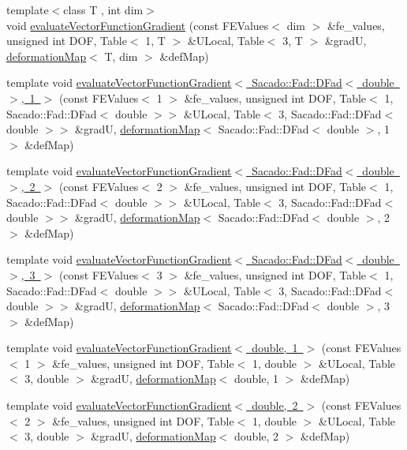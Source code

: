 \begin{DoxyCompactItemize}
\item 
{\footnotesize template$<$class T , int dim$>$ }\\void \mbox{\hyperlink{group___evaluation_functions_ga5adf8aa2d91dbdf393aa91dcc65e42e8}{evaluate\+Vector\+Function\+Gradient}} (const F\+E\+Values$<$ dim $>$ \&fe\+\_\+values, unsigned int D\+OF, Table$<$ 1, T $>$ \&U\+Local, Table$<$ 3, T $>$ \&gradU, \mbox{\hyperlink{structdeformation_map}{deformation\+Map}}$<$ T, dim $>$ \&def\+Map)
\item 
template void \mbox{\hyperlink{function_evaluations_8cc_a1fb7d1f43d659f0916ca96a9c951931c}{evaluate\+Vector\+Function\+Gradient$<$ Sacado\+::\+Fad\+::\+D\+Fad$<$ double $>$, 1 $>$}} (const F\+E\+Values$<$ 1 $>$ \&fe\+\_\+values, unsigned int D\+OF, Table$<$ 1, Sacado\+::\+Fad\+::\+D\+Fad$<$ double $>$$>$ \&U\+Local, Table$<$ 3, Sacado\+::\+Fad\+::\+D\+Fad$<$ double $>$$>$ \&gradU, \mbox{\hyperlink{structdeformation_map}{deformation\+Map}}$<$ Sacado\+::\+Fad\+::\+D\+Fad$<$ double $>$, 1 $>$ \&def\+Map)
\item 
template void \mbox{\hyperlink{function_evaluations_8cc_a85f7c6e4046993a83815972185df45ab}{evaluate\+Vector\+Function\+Gradient$<$ Sacado\+::\+Fad\+::\+D\+Fad$<$ double $>$, 2 $>$}} (const F\+E\+Values$<$ 2 $>$ \&fe\+\_\+values, unsigned int D\+OF, Table$<$ 1, Sacado\+::\+Fad\+::\+D\+Fad$<$ double $>$$>$ \&U\+Local, Table$<$ 3, Sacado\+::\+Fad\+::\+D\+Fad$<$ double $>$$>$ \&gradU, \mbox{\hyperlink{structdeformation_map}{deformation\+Map}}$<$ Sacado\+::\+Fad\+::\+D\+Fad$<$ double $>$, 2 $>$ \&def\+Map)
\item 
template void \mbox{\hyperlink{function_evaluations_8cc_aa336e130a0840b38bf3470c6b1133bb7}{evaluate\+Vector\+Function\+Gradient$<$ Sacado\+::\+Fad\+::\+D\+Fad$<$ double $>$, 3 $>$}} (const F\+E\+Values$<$ 3 $>$ \&fe\+\_\+values, unsigned int D\+OF, Table$<$ 1, Sacado\+::\+Fad\+::\+D\+Fad$<$ double $>$$>$ \&U\+Local, Table$<$ 3, Sacado\+::\+Fad\+::\+D\+Fad$<$ double $>$$>$ \&gradU, \mbox{\hyperlink{structdeformation_map}{deformation\+Map}}$<$ Sacado\+::\+Fad\+::\+D\+Fad$<$ double $>$, 3 $>$ \&def\+Map)
\item 
template void \mbox{\hyperlink{function_evaluations_8cc_a62dbc9fdef114b76a143e86bb1c6df96}{evaluate\+Vector\+Function\+Gradient$<$ double, 1 $>$}} (const F\+E\+Values$<$ 1 $>$ \&fe\+\_\+values, unsigned int D\+OF, Table$<$ 1, double $>$ \&U\+Local, Table$<$ 3, double $>$ \&gradU, \mbox{\hyperlink{structdeformation_map}{deformation\+Map}}$<$ double, 1 $>$ \&def\+Map)
\item 
template void \mbox{\hyperlink{function_evaluations_8cc_a2d6fafd5544183a2ed0f3190b142c853}{evaluate\+Vector\+Function\+Gradient$<$ double, 2 $>$}} (const F\+E\+Values$<$ 2 $>$ \&fe\+\_\+values, unsigned int D\+OF, Table$<$ 1, double $>$ \&U\+Local, Table$<$ 3, double $>$ \&gradU, \mbox{\hyperlink{structdeformation_map}{deformation\+Map}}$<$ double, 2 $>$ \&def\+Map)

\end{DoxyCompactItemize}
